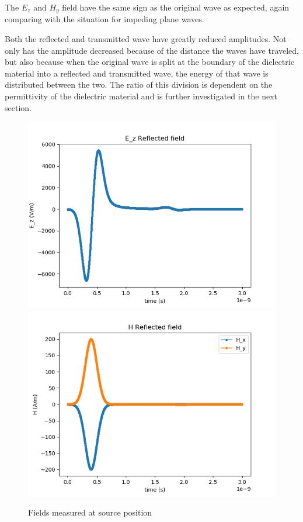 \documentclass[11pt, a4paper]{article}
\begin{document}
The $E_z$ and $H_y$ field have the same sign as the original wave as expected, again comparing with the situation for impeding plane waves.

Both the reflected and transmitted wave have greatly reduced amplitudes. Not only has the amplitude decreased because of the distance the waves have traveled, but also because when the original wave is split at the boundary of the dielectric material into a reflected and transmitted wave, the energy of that wave is distributed between the two. The ratio of this division is dependent on the permittivity of the dielectric material and is further investigated in the next section.   

\begin{figure}[H]
    \centering
    \includegraphics[width=0.49\linewidth]{halfspace/Ezr.png}
    \includegraphics[width=0.49\linewidth]{halfspace/Hxyr.png}
    \caption{Fields measured at source position}
    \label{hs_source}
\end{figure}
\end{document}
